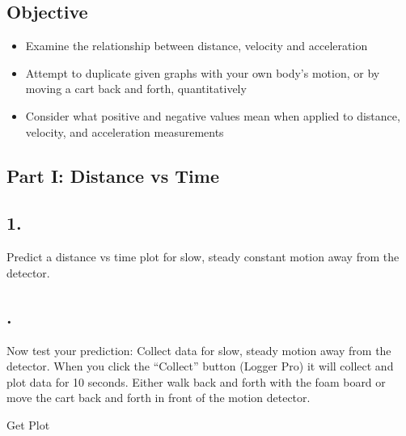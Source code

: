     \subsection*{Objective}

    \begin{itemize}
        \item Examine the relationship between distance, velocity and acceleration
        \item Attempt to duplicate given graphs with your own body's motion, or by moving a cart back and forth, quantitatively
        \item Consider what positive and negative values mean when applied to distance, velocity, and acceleration measurements
        
    \end{itemize}

    \subsection*{Part I: Distance vs Time}

    \subsection*{1.}
    Predict a distance vs time plot for slow, steady constant motion away from the detector.

    \begin{mdframed}
        \centering{}
    \end{mdframed}

    \subsection*{.}
    Now test your prediction: Collect data for slow, steady motion away from the detector. When you click the “Collect” button (Logger Pro) it will collect and plot data for 10 seconds. Either walk back and forth with the foam board or move the cart back and forth in front of the motion detector.

    \begin{mdframed}
        Get Plot
    \end{mdframed}

